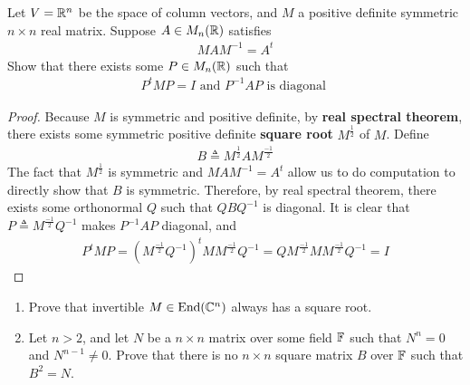 \documentclass{report}
\begin{document}
\begin{question}{}{}
Let $V=\mathbb{R}^n$ be the space of column vectors, and  $M$ a positive definite symmetric  $n\times n$ real matrix. Suppose $A\in M_{n}(\mathbb{R})$ satisfies 
\begin{align*}
MAM^{-1}=A^t
\end{align*}
Show that there exists some $P \in M_n(\mathbb{R})$ such that 
\begin{align*}
P^t M P = I \text{ and }P^{-1}AP\text{ is diagonal }
\end{align*}
\end{question}
\begin{proof}
  Because $M$ is symmetric and positive definite, by \textbf{real spectral theorem}, there exists some symmetric positive definite \textbf{square root} $M^{\frac{1}{2}}$ of $M$.  Define 
\begin{align*}
B \triangleq M^{\frac{1}{2}}AM^{\frac{-1}{2}}
\end{align*}
The fact that $M^{\frac{1}{2}}$ is symmetric and $MAM^{-1}=A^t$ allow us to do computation to directly show that  $B$ is symmetric. Therefore, by real spectral theorem, there exists some orthonormal $Q$ such that  $QBQ^{-1}$ is diagonal. It is clear that $P\triangleq M^{\frac{-1}{2}}Q^{-1}$ makes $P^{-1}AP$ diagonal, and 
\begin{align*}
P^tMP= (M^{\frac{-1}{2}}Q^{-1})^t M M^{\frac{-1}{2}}Q^{-1}= Q M^{\frac{-1}{2}}MM^{\frac{-1}{2}}Q^{-1}=I
\end{align*}
\end{proof}
\begin{question}{}{}
\begin{enumerate}[label=(\alph*)]
  \item Prove that invertible $M \in \operatorname{End}(\mathbb{C}^n)$ always has a square root. 
  \item  Let $n>2$, and let $N$ be a  $n\times n$ matrix over some field $\mathbb{F}$ such that $N^n=0$ and $N^{n-1}\neq 0$. Prove that there is no $n\times n$ square matrix $B$ over $\mathbb{F}$  such that $B^2=N$. 
\end{enumerate}
\end{question}
\end{document}
